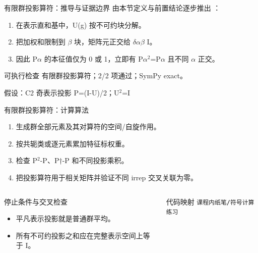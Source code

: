 \begin{frame}[t]{有限群投影算符：推导与证据边界}
\footnotesize
{}\quad 由本节定义与前置结论逐步推出 ：
\begin{enumerate}
\item 在表示直和基中，U(g) 按不可约块分解。
\item 把加权和限制到 \ensuremath{\beta} 块，矩阵元正交给 \ensuremath{\delta}\ensuremath{\alpha}\ensuremath{\beta} I。
\item 因此 P\ensuremath{\alpha} 的本征值仅为 0 或 1，立即有 P\ensuremath{\alpha}\ensuremath{^{2}}=P\ensuremath{\alpha} 且不同 \ensuremath{\alpha} 正交。
\end{enumerate}\begin{block}{可执行检查}
\quad 有限群投影算符；2/2 项通过；SymPy exact。
\par\scriptsize 假设：C2 奇表示投影 P=(I-U)/\allowbreak{}2；U\ensuremath{^{2}}=I
\end{block}
\end{frame}

\begin{frame}[t]{有限群投影算符：计算算法}
\footnotesize
{}\begin{enumerate}
\item 生成群全部元素及其对算符的空间/\allowbreak{}自旋作用。
\item 按共轭类或逐元素累加特征标权重。
\item 检查 P\ensuremath{^{2}}-P、P†-P 和不同投影乘积。
\item 把投影算符用于相关矩阵并验证不同 irrep 交叉关联为零。
\end{enumerate}\begin{columns}[T,onlytextwidth]
\begin{block}{停止条件与交叉检查}\scriptsize\begin{itemize}
\item[\CheckMark] 平凡表示投影就是普通群平均。
\item[\CheckMark] 所有不可约投影之和应在完整表示空间上等于 I。
\end{itemize}\end{block}
\begin{block}{代码映射}
\scriptsize \texttt{课程内纸笔/\allowbreak{}符号计算练习}
\end{block}\end{columns}\end{frame}

